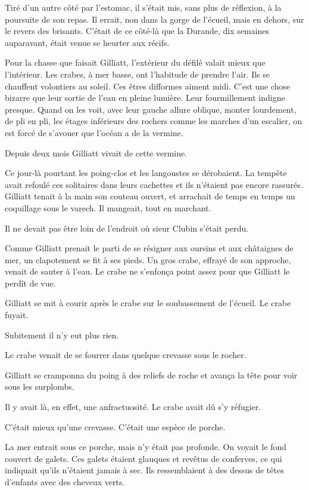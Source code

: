 \documentclass[french,twoside]{book} %
\begin{document}
Tiré d’un autre côté par l’estomac, il s’était mis, sans plus de réflexion, à la poursuite de son repas. Il errait, non dans la gorge de l’écueil, mais en dehors, sur le revers des brisants. C’était de ce côté-là que la  Durande, dix semaines auparavant, était venue se heurter aux récifs.\par
Pour la chasse que faisait Gilliatt, l’extérieur du défilé valait mieux que l’intérieur. Les crabes, à mer basse, ont l’habitude de prendre l’air. Ils se chauffent volontiers au soleil. Ces êtres difformes aiment midi. C’est une chose bizarre que leur sortie de l’eau en pleine lumière. Leur fourmillement indigne presque. Quand on les voit, avec leur gauche allure oblique, monter lourdement, de pli en pli, les étages inférieurs des rochers comme les marches d’un escalier, on est forcé de s’avouer que l’océan a de la vermine.\par
Depuis deux mois Gilliatt vivait de cette vermine.\par
Ce jour-là pourtant les poing-clos et les langoustes se dérobaient. La tempête avait refoulé ces solitaires dans leurs cachettes et ils n’étaient pas encore rassurés. Gilliatt tenait à la main son couteau ouvert, et arrachait de temps en temps un coquillage sous le varech. Il mangeait, tout en marchant.\par
Il ne devait pas être loin de l’endroit où sieur Clubin s’était perdu.\par
Comme Gilliatt prenait le parti de se résigner aux oursins et aux châtaignes de mer, un clapotement se fit à ses pieds. Un gros crabe, effrayé de son approche, venait de sauter à l’eau. Le crabe ne s’enfonça point assez pour que Gilliatt le perdît de vue.\par
Gilliatt se mit à courir après le crabe sur le soubassement de l’écueil. Le crabe fuyait.\par
Subitement il n’y eut plus rien.\par
 Le crabe venait de se fourrer dans quelque crevasse sous le rocher.\par
Gilliatt se cramponna du poing à des reliefs de roche et avança la tête pour voir sous les surplombs.\par
Il y avait là, en effet, une anfractuosité. Le crabe avait dû s’y réfugier.\par
C’était mieux qu’une crevasse. C’était une espèce de porche.\par
La mer entrait sous ce porche, mais n’y était pas profonde. On voyait le fond couvert de galets. Ces galets étaient glauques et revêtus de conferves, ce qui indiquait qu’ils n’étaient jamais à sec. Ils ressemblaient à des dessus de têtes d’enfants avec des cheveux verts.\par
\end{document}
